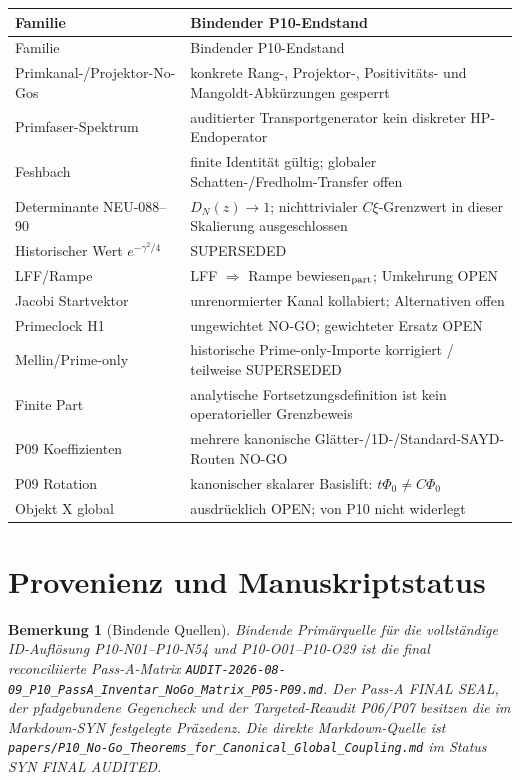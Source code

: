 \documentclass[11pt,a4paper]{amsart}
\newtheorem{remark}[theorem]{Bemerkung}
\begin{document}
\small
\begin{longtable}{>{\raggedright\arraybackslash}p{}
                  >{\raggedright\arraybackslash}p{}}
\toprule
Familie & Bindender P10-Endstand\\
\midrule
\endfirsthead
\toprule
Familie & Bindender P10-Endstand\\
\midrule
\endhead
Primkanal-/Projektor-No-Gos
& konkrete Rang-, Projektor-, Positivitäts- und Mangoldt-Abkürzungen gesperrt\\
Primfaser-Spektrum
& auditierter Transportgenerator kein diskreter HP-Endoperator\\
Feshbach
& finite Identität gültig; globaler Schatten-/Fredholm-Transfer offen\\
Determinante NEU-088--90
& $D_N(z)\to1$; nichttrivialer $C\xi$-Grenzwert in dieser Skalierung ausgeschlossen\\
Historischer Wert $e^{-\gamma^2/4}$
& SUPERSEDED\\
LFF/Rampe
& LFF $\Rightarrow$ Rampe bewiesen$_{\rm part}$; Umkehrung OPEN\\
Jacobi Startvektor
& unrenormierter Kanal kollabiert; Alternativen offen\\
Primeclock H1
& ungewichtet NO-GO; gewichteter Ersatz OPEN\\
Mellin/Prime-only
& historische Prime-only-Importe korrigiert / teilweise SUPERSEDED\\
Finite Part
& analytische Fortsetzungsdefinition ist kein operatorieller Grenzbeweis\\
P09 Koeffizienten
& mehrere kanonische Glätter-/1D-/Standard-SAYD-Routen NO-GO\\
P09 Rotation
& kanonischer skalarer Basislift: $t\Phi_0\ne C\Phi_0$\\
Objekt X global
& ausdrücklich OPEN; von P10 nicht widerlegt\\
\bottomrule
\end{longtable}
\normalsize

\section{Provenienz und Manuskriptstatus}

\begin{remark}[Bindende Quellen]
Bindende Primärquelle für die vollständige ID-Auflösung P10-N01--P10-N54 und
P10-O01--P10-O29 ist die final reconciliierte Pass-A-Matrix
\texttt{AUDIT-2026-08-09\_P10\_PassA\_Inventar\_NoGo\_Matrix\_P05-P09.md}.
Der Pass-A FINAL SEAL, der pfadgebundene Gegencheck und der Targeted-Reaudit
P06/P07 besitzen die im Markdown-SYN festgelegte Präzedenz. Die direkte
Markdown-Quelle ist
\texttt{papers/P10\_No-Go\_Theorems\_for\_Canonical\_Global\_Coupling.md}
im Status \emph{SYN FINAL AUDITED}.
\end{remark}
\end{document}
